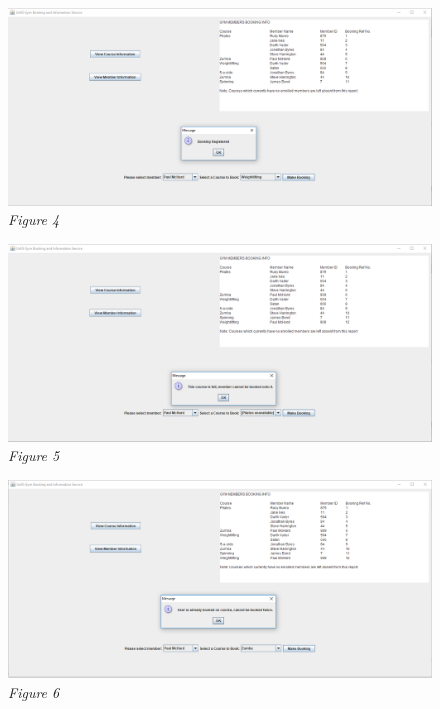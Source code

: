 \documentclass[12pt, oneside]{article}
\begin{document}
\begin{figure}[ht!]
\centering
\includegraphics[width=17cm]{fig5}
\caption*{ \textit{Figure 4} }
\end{figure}
\begin{figure}[ht!]
\centering
\includegraphics[width=17cm]{fig8}
\caption*{ \textit{Figure 5} }
\end{figure}
\begin{figure}[ht!]
\centering
\includegraphics[width=17cm]{fig10}
\caption*{ \textit{Figure 6} }
\end{figure}
\end{document}
